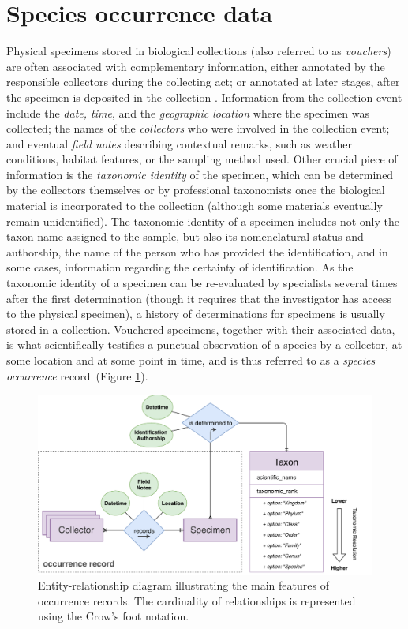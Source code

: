 \section{Species occurrence data} \label{section:occurrence_data}
Physical specimens stored in biological collections (also referred to as \textit{vouchers}) are often associated with complementary information, either annotated by the responsible collectors during the collecting act; or annotated at later stages, after the specimen is deposited in the collection \cite{Chapman2005}.
Information from the collection event include the \textit{date, time}, and the \textit{geographic location} where the specimen was collected; the names of the \textit{collectors} who were involved in the collection event; and eventual \textit{field notes} describing contextual remarks, such as weather conditions, habitat features, or the sampling method used.
Other crucial piece of information is the \textit{taxonomic identity} of the specimen, which can be determined by the collectors themselves or by professional taxonomists once the biological material is incorporated to the collection (although some materials eventually remain unidentified).
%
The taxonomic identity of a specimen includes not only the taxon name assigned to the sample, but also its nomenclatural status and authorship, the name of the person who has provided the identification, and in some cases, information regarding the certainty of identification.
As the taxonomic identity of a specimen can be re-evaluated by specialists several times after the first determination (though it requires that the investigator has access to the physical specimen), a history of determinations for specimens is usually stored in a collection.
%
Vouchered specimens, together with their associated data, is what scientifically testifies a punctual observation of a species by a collector, at some location and at some point in time, and is thus referred to as a \textit{species occurrence} record~(Figure \ref{fig:occurrences_er}).

\begin{figure}[ht]
  	\centering
    \includegraphics[width=\linewidth]{figures/collections_data/occurrences_er.pdf}
    \caption[Entity-relationship diagram illustrating the main features of occurrence records]{Entity-relationship diagram illustrating the main features of occurrence records. The cardinality of relationships is represented using the Crow's foot notation.}
    \label{fig:occurrences_er}
\end{figure}

